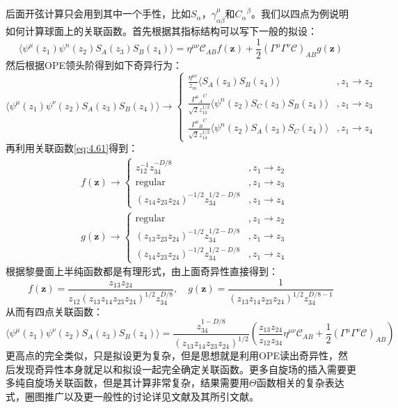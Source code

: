 后面开弦计算只会用到其中一个手性，比如$S_\alpha$，$\gamma^\mu_{\alpha\dot\beta}$和${C_{\alpha}}^{\dot\beta}$。我们以四点为例说明如何计算球面上的关联函数。首先根据其指标结构可以写下一般的拟设：
\begin{equation}
	\langle\psi^\mu(z_1)\psi^n(z_2)S_A(z_3)S_B(z_4)\rangle=\eta^{\mu\nu}\mathcal{C}_{AB}f(\mathbf{z})+\frac{1}{2}(\Gamma^\mu\Gamma^\nu\mathcal{C})_{AB}g(\mathbf{z})
\end{equation}
然后根据OPE领头阶得到如下奇异行为：
\begin{equation}
	\langle\psi^\mu(z_1)\psi^\nu(z_2)S_A(z_3)S_B(z_4)\rangle\to
	\begin{cases}\frac{\eta^{\mu\nu}}{z_m}\langle S_A(z_3)S_B(z_4)\rangle&, z_1\to z_2\\\frac{{{\Gamma^{\mu}}_A}^C}{\sqrt{2}z_{13}^{1/2}}\langle\psi^n(z_2)S_C(z_3)S_B(z_4)\rangle&, z_1\to z_3\\\frac{{{\Gamma^{\mu}}_B}^C}{\sqrt{2}z_{14}^{1/2}}\langle\psi^n(z_2)S_A(z_3)S_C(z_4)\rangle&, z_1\to z_4
	\end{cases}
\end{equation}
再利用关联函数\ref{eq:4.61}得到：
\begin{equation}
	\begin{aligned}
		&f(\mathbf{z})\to\begin{cases}z_{12}^{-1}z_{34}^{-D/8}&,z_1\to z_2\\\mathrm{regular}&,z_1\to z_3\\(z_{14}z_{23}z_{24})^{-1/2}z_{34}^{1/2-D/8}&,z_1\to z_4\end{cases}\\
		&g(\mathbf{z})\to\begin{cases}\mathrm{regular}&,z_1\to z_2\\(z_{13}z_{23}z_{24})^{-1/2}z_{34}^{1/2-D/8}&,z_1\to z_3\\(z_{14}z_{23}z_{24})^{-1/2}z_{34}^{1/2-D/8}&,z_1\to z_4\end{cases}
	\end{aligned}
\end{equation}
根据黎曼面上半纯函数都是有理形式，由上面奇异性直接得到：
\begin{equation}
	f(\mathbf{z})=\frac{z_{13}z_{24}}{z_{12}(z_{13}z_{14}z_{23}z_{24})^{1/2}z_{34}^{D/8}},\quad g(\mathbf{z})=\frac{1}{(z_{13}z_{14}z_{23}z_{24})^{1/2}z_{34}^{D/8-1}}
\end{equation}
从而有四点关联函数：
\begin{equation}
	\langle\psi^\mu(z_1)\psi^\nu(z_2)S_A(z_3)S_B(z_4)\rangle=\frac{z_{34}^{1-D/8}}{(z_{13}z_{14}z_{23}z_{24})^{1/2}}\left(\frac{z_{13}z_{24}}{z_{12}z_{34}}\eta^{\mu\nu}\mathcal{C}_{AB}+\frac{1}{2}(\Gamma^\mu\Gamma^\nu\mathcal{C})_{AB}\right)
\end{equation}
更高点的完全类似，只是拟设更为复杂，但是思想就是利用OPE读出奇异性，然后发现奇异性本身就足以和拟设一起完全确定关联函数。更多自旋场的插入需要更多纯自旋场关联函数，但是其计算非常复杂，结果需要用$\Theta$函数相关的复杂表达式，圈图推广以及更一般性的讨论详见文献\cite{Schlotterer:2012zz,Hartl:2011tza,Haertl:2011yvw}及其所引文献。
